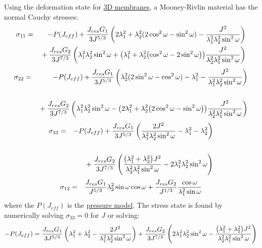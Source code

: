 \documentclass[11pt]{book}
\def\Jeff{J_{eff}}
\def\Jres{J_{res}}
\begin{document}
Using the deformation state for \hyperref[MMT]{3D membranes}, a Mooney-Rivlin material has the normal Cauchy stresses:
\begin{eqnarray}
      \sigma_{11} & = & -P(\Jeff) + {\Jres G_1\over 3J^{5/3}}\left(2\lambda_1^2 + \lambda_2^2(2\cos^2\omega-\sin^2\omega) - {J^2\over \lambda_1^2\lambda_2^2\sin^2\omega}\right)
\nonumber\\
&&\mbox{}
          + {\Jres G_2\over 3J^{7/3}}\left(\lambda_1^2\lambda_2^2 \sin^2\omega   
          + \bigl(\lambda_1^2+\lambda_2^2\bigl(\cos^2\omega - 2\sin^2\omega\bigr)\bigr){J^2\over \lambda_2^2\lambda_1^2\sin^2\omega} \right) 
\end{eqnarray}
\begin{eqnarray}
      \sigma_{22} & = & -P(\Jeff) + {\Jres G_1\over 3J^{5/3}}\left(\lambda_2^2(2\sin^2\omega-\cos^2\omega) - \lambda_1^2 - {J^2\over \lambda_1^2\lambda_2^2\sin^2\omega}\right)  \\
\nonumber\\
&&\mbox{}
          + {\Jres G_2\over 3J^{7/3}}\left(\lambda_1^2\lambda_2^2 \sin^2\omega   
          - \bigl(2\lambda_1^2+\lambda_2^2\bigl(2\cos^2\omega - \sin^2\omega\bigr)\bigr){J^2\over \lambda_2^2\lambda_1^2\sin^2\omega} \right) 
\end{eqnarray}
\begin{eqnarray}
      \sigma_{33} & = & -P(\Jeff) + {\Jres G_1\over 3J^{5/3}}\left({2J^2\over \lambda_1^2\lambda_2^2\sin^2\omega} - \lambda_1^2 - \lambda_2^2\right)  \\
\nonumber\\
&&\mbox{}
          + {\Jres G_2\over 3J^{7/3}}\left({\bigl(\lambda_1^2+\lambda_2^2\bigr)J^2\over \lambda_2^2\lambda_1^2\sin^2\omega}
          -2\lambda_1^2\lambda_2^2 \sin^2\omega    \right) 
\end{eqnarray}
\begin{eqnarray}
      \sigma_{12} & = &  {\Jres G_1\over J^{5/3}}\lambda_2^2\sin\omega\cos\omega
            + {\Jres G_2\over J^{1/3}}{\cos\omega\over \lambda_1^2\sin\omega}
\end{eqnarray}
where the $P(\Jeff)$ is the \hyperref[PTerms]{pressure model}. The stress state is found by numerically solving $\sigma_{33}=0$ for $J$ or solving:
\begin{equation}
	-P(\Jeff) =  {\Jres G_1\over 3J^{5/3}}\left(\lambda_1^2 + \lambda_2^2 - {2J^2\over \lambda_1^2\lambda_2^2\sin^2\omega}\right)
	       + {\Jres G_2\over 3J^{7/3}}\left(2\lambda_1^2\lambda_2^2 \sin^2\omega
	       - {\bigl(\lambda_1^2+\lambda_2^2\bigr)J^2\over \lambda_2^2\lambda_1^2\sin^2\omega}
          \right)
\end{equation}
\end{document}
